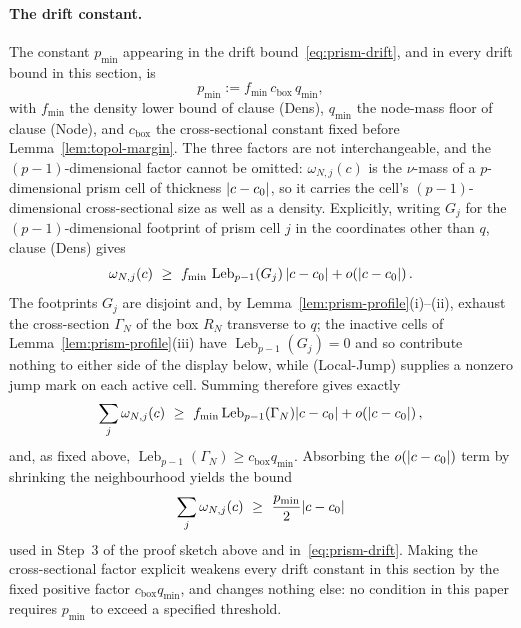\documentclass[11pt]{article}
\theoremstyle{plain}
\theoremstyle{definition}
\theoremstyle{remark}
\DeclarePairedDelimiter{\abs}{\lvert}{\rvert}
\begin{document}
\paragraph{The drift constant.}
The constant \(p_{\min}\) appearing in the drift bound~\eqref{eq:prism-drift},
and in every drift bound in this section, is
\[
  p_{\min}:=f_{\min}\,c_{\mathrm{box}}\,q_{\min},
\]
with \(f_{\min}\) the density lower bound of clause (Dens), \(q_{\min}\) the
node-mass floor of clause (Node), and \(c_{\mathrm{box}}\) the
cross-sectional constant fixed before Lemma~\ref{lem:topol-margin}. The
three factors are not interchangeable, and the \((p-1)\)-dimensional factor
cannot be omitted: \(\omega_{N,j}(c)\) is the \(\nu\)-mass of a
\(p\)-dimensional prism cell of thickness \(\abs{c-c_0}\), so it carries the
cell's \((p-1)\)-dimensional cross-sectional size as well as a density.
Explicitly, writing \(G_j\) for the \((p-1)\)-dimensional footprint of prism
cell \(j\) in the coordinates other than \(q\), clause (Dens) gives
\[
  \omega_{N,j}(c)
  \ \ge\
  f_{\min}\,\operatorname{Leb}_{p-1}(G_j)\,\abs{c-c_0}
  +o\!\left(\abs{c-c_0}\right).
\]
The footprints \(G_j\) are disjoint and, by Lemma~\ref{lem:prism-profile}(i)--(ii),
exhaust the cross-section \(\Gamma_N\) of the box \(R_N\) transverse to
\(q\); the inactive cells of Lemma~\ref{lem:prism-profile}(iii) have
\(\operatorname{Leb}_{p-1}(G_j)=0\) and so contribute nothing to either side of
the display below, while (Local-Jump) supplies a nonzero jump mark on each
active cell. Summing therefore
gives exactly
\[
  \sum_j\omega_{N,j}(c)
  \ \ge\
  f_{\min}\operatorname{Leb}_{p-1}(\Gamma_N)\abs{c-c_0}
  +o\!\left(\abs{c-c_0}\right),
\]
and, as fixed above, \(\operatorname{Leb}_{p-1}(\Gamma_N)\ge c_{\mathrm{box}}
q_{\min}\). Absorbing the \(o(\abs{c-c_0})\) term by shrinking the
neighbourhood yields the bound
\[
  \sum_j\omega_{N,j}(c)\ \ge\ \frac{p_{\min}}{2}\abs{c-c_0}
\]
used in Step~3 of the proof sketch above and in~\eqref{eq:prism-drift}. Making
the cross-sectional factor explicit weakens every drift constant in this
section by the fixed positive factor \(c_{\mathrm{box}}q_{\min}\),
and changes nothing else: no condition in this paper requires
\(p_{\min}\) to exceed a specified threshold.
\end{document}
